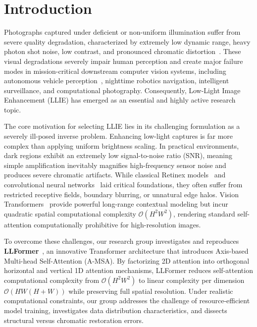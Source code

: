 \documentclass[conference]{IEEEtran}
\begin{document}
\section{Introduction}
\label{sec:intro}

Photographs captured under deficient or non-uniform illumination suffer from severe quality degradation, characterized by extremely low dynamic range, heavy photon shot noise, low contrast, and pronounced chromatic distortion~\cite{land1971retinex,jobson1997multiscale}. These visual degradations severely impair human perception and create major failure modes in mission-critical downstream computer vision systems, including autonomous vehicle perception~\cite{chen2018learning}, nighttime robotics navigation, intelligent surveillance, and computational photography. Consequently, Low-Light Image Enhancement (LLIE) has emerged as an essential and highly active research topic.

The core motivation for selecting LLIE lies in its challenging formulation as a severely ill-posed inverse problem. Enhancing low-light captures is far more complex than applying uniform brightness scaling. In practical environments, dark regions exhibit an extremely low signal-to-noise ratio (SNR), meaning simple amplification inevitably magnifies high-frequency sensor noise and produces severe chromatic artifacts. While classical Retinex models~\cite{land1971retinex,jobson1997multiscale} and convolutional neural networks~\cite{wei2018retinexnet,zhang2019kind} laid critical foundations, they often suffer from restricted receptive fields, boundary blurring, or unnatural edge halos. Vision Transformers~\cite{vaswani2017attention} provide powerful long-range contextual modeling but incur quadratic spatial computational complexity $\mathcal{O}(H^2W^2)$, rendering standard self-attention computationally prohibitive for high-resolution images.

To overcome these challenges, our research group investigates and reproduces \textbf{LLFormer}~\cite{wang2023llformer}, an innovative Transformer architecture that introduces Axis-based Multi-head Self-Attention (A-MSA). By factorizing 2D attention into orthogonal horizontal and vertical 1D attention mechanisms, LLFormer reduces self-attention computational complexity from $\mathcal{O}(H^2W^2)$ to linear complexity per dimension $\mathcal{O}(HW(H+W))$ while preserving full spatial resolution. Under realistic computational constraints, our group addresses the challenge of resource-efficient model training, investigates data distribution characteristics, and dissects structural versus chromatic restoration errors.
\end{document}
